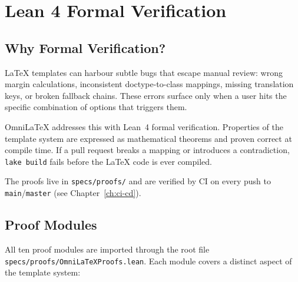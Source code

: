 \chapter{Lean 4 Formal Verification}
\label{ch:lean4}

\section{Why Formal Verification?}

LaTeX templates can harbour subtle bugs that escape manual review: wrong
margin calculations, inconsistent doctype-to-class mappings, missing
translation keys, or broken fallback chains.  These errors surface only
when a user hits the specific combination of options that triggers them.

OmniLaTeX addresses this with Lean~4 formal verification.  Properties of
the template system are expressed as mathematical theorems and proven
correct at compile time.  If a pull request breaks a mapping or
introduces a contradiction, \texttt{lake build} fails before the LaTeX
code is ever compiled.

The proofs live in \texttt{specs/proofs/} and are verified by CI on every
push to \texttt{main}/\texttt{master} (see Chapter~\ref{ch:ci-cd}).

\section{Proof Modules}

All ten proof modules are imported through the root file
\texttt{specs/proofs/OmniLaTeXProofs.lean}.  Each module covers a
distinct aspect of the template system:

